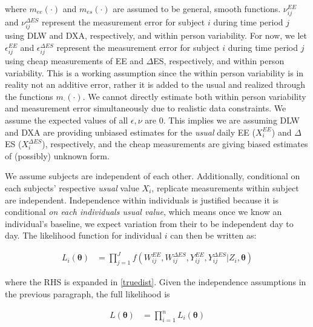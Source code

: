 \documentclass[11pt]{article}\usepackage[]{graphicx}\usepackage[]{color}
\begin{document}
where $m_{ee}(\cdot)$ and $m_{es}(\cdot)$ are assumed to be general, smooth functions. $\nu_{ij}^{EE}$ and $\nu_{ij}^{\Delta ES}$ represent the measurement error for subject $i$ during time period $j$ using DLW and DXA, respectively, and within person variability. For now, we let $\epsilon_{ij}^{EE}$ and $\epsilon_{ij}^{\Delta ES}$ represent the measurement error for subject $i$ during time period $j$ using cheap measurements of EE and $\Delta$ES, respectively, and within person variability. This is a working assumption since the within person variability is in reality not an additive error, rather it is added to the usual and realized through the functions $m_{\cdot}(\cdot)$. We cannot directly estimate both within person variability and measurement error simultaneously due to realistic data constraints.  We assume the expected values of all $\epsilon,\nu$ are 0. This implies we are assuming DLW and DXA are providing unbiased estimates for the \emph{usual} daily EE ($X_i^{EE}$) and $\Delta$ES ($X_i^{\Delta ES}$), respectively, and the cheap measurements are giving biased estimates of (possibly) unknown form.


We assume subjects are independent of each other. Additionally, conditional on each subjects' respective \emph{usual} value $X_i^{\cdot}$, replicate measurements within subject are independent. Independence within individuals is justified because it is conditional \emph{on each individuals usual value}, which means once we know an individual's baseline, we expect variation from their to be independent day to day. The likelihood function for individual $i$ can then be written as:

\begin{align}
  L_i(\boldsymbol{\theta}) &= \prod_{j=1}^{J} f(W_{ij}^{EE},W_{ij}^{\Delta ES}, Y_{ij}^{EE},Y_{ij}^{\Delta ES}|Z_i,\boldsymbol{\theta}) 
\end{align}

where the RHS is expanded in \eqref{truedist}. Given the independence assumptions in the previous paragraph,  the full likelihood is

\begin{align}
  L(\boldsymbol{\theta}) &= \prod_{i=1}^{n}  L_i(\boldsymbol{\theta}) 
\end{align}



\end{document}
